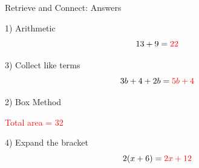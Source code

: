 \documentclass{beamer}
\begin{document}
\begin{frame}{Retrieve and Connect: Answers}
\begin{minipage}[t]{0.48\textwidth}

\begin{block}{1) Arithmetic}
\Large
\[
13 + 9 = \textcolor{red}{22}
\]
\end{block}

\vspace{6.2em}

\begin{block}{3) Collect like terms}
\Large
\[
3b + 4 + 2b = \textcolor{red}{5b + 4}
\]
\end{block}

\end{minipage}\hfill
\begin{minipage}[t]{0.48\textwidth}

\begin{block}{2) Box Method}
\centering
{}

\vspace{0.4em}
\textcolor{red}{Total area = 32}

\end{block}

\vspace{0.6em}

\begin{block}{4) Expand the bracket}
\Large
\[
2(x+6) = \textcolor{red}{2x + 12}
\]
\end{block}

\end{minipage}
\end{frame}
\end{document}
